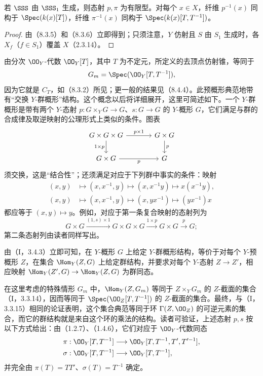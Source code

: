 若 $\SSS$ 由 $\SSS_1$ 生成，则态射 $p,\pi$ 为有限型。对每个 $x\in X$，纤维 $p^{-1}(x)$ 同构于 $\Spec(k(x)[T])$，纤维 $\pi^{-1}(x)$ 同构于 $\Spec(k(x)[T,T^{-1}])$。
\begin{proof}
由（8.3.5）和（8.3.6）立即得到；只须注意，$Y$ 仿射且 $S$ 由 $S_1$ 生成时，各 $X_f$（$f\in S_1$）覆盖 $X$（2.3.14）。
\end{proof}

由分次 $\OO_Y$-代数 $\OO_Y[T]$，其中 $T$ 为不定元，所定义的去顶点仿射锥，等同于
\[
G_m=\Spec(\OO_Y[T,T^{-1}]),
\]
因为它就是 $C_T$，如（8.3.2）所见；更一般的结果见（8.4.4）。此预概形典范地带有“交换 $Y$-群概形”结构。这个概念以后将详细展开，这里可简述如下。一个 $Y$-群概形是带有两个 $Y$-态射 $p:G\times_YG\to G$、$s:G\to G$ 的 $Y$-概形 $G$，它们满足与群的合成律及取逆映射的公理形式上类似的条件。图表
\[
\begin{tikzcd}[column sep=large]
G\times G\times G \arrow[r,"p\times1"] \arrow[d,"1\times p"'] & G\times G \arrow[d,"p"] \\
G\times G \arrow[r,"p"'] & G
\end{tikzcd}
\]
须交换，这是“结合性”；还须满足对应于下列群中事实的条件：映射
\[
\begin{aligned}
(x,y)&\longmapsto(x,x^{-1},y)\longmapsto(x,x^{-1}y)\longmapsto x(x^{-1}y),\\
(x,y)&\longmapsto(x,x^{-1},y)\longmapsto(x,yx^{-1})\longmapsto(yx^{-1})x
\end{aligned}
\]
都应等于 $(x,y)\mapsto y$。例如，对应于第一条复合映射的态射列为
\[
G\times G\xrightarrow{(1,s)\times1}G\times G\times G
\xrightarrow{1\times p}G\times G\xrightarrow{p}G;
\]
第二条态射列由读者同样写出。

由（I，3.4.3）立即可知，在 $Y$-概形 $G$ 上给定 $Y$-群概形结构，等价于对每个 $Y$-预概形 $Z$，在集合 $\Hom_Y(Z,G)$ 上给定群结构，并要求对每个 $Y$-态射 $Z\to Z'$，相应映射 $\Hom_Y(Z',G)\to\Hom_Y(Z,G)$ 为群同态。

在这里考虑的特殊情形 $G_m$ 中，$\Hom_Y(Z,G_m)$ 等同于 $Z\times_YG_m$ 的 $Z$-截面的集合（I，3.3.14），因而等同于 $\Spec(\OO_Z[T,T^{-1}])$ 的 $Z$-截面的集合。最终，与（I，3.3.15）相同的论证表明，这个集合典范等同于环 $\Gamma(Z,\OO_Z)$ 的可逆元素的集合，而它的群结构就是来自这个环的乘法的结构。读者可验证，上述态射 $p,s$ 按以下方式给出：由（1.2.7）、（1.4.6），它们对应于 $\OO_Y$-代数同态
\[
\begin{aligned}
\pi &: \OO_Y[T,T^{-1}]\longrightarrow\OO_Y[T,T^{-1},T',T'^{-1}],\\
\sigma &: \OO_Y[T,T^{-1}]\longrightarrow\OO_Y[T,T^{-1}],
\end{aligned}
\]
并完全由 $\pi(T)=TT'$、$\sigma(T)=T^{-1}$ 确定。

